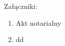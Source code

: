 \documentclass[a4paper,12pt,oneside]{article}
\begin{document}
	\tableofcontents
	
	
	
	
	
	
	
	Załączniki:
	\begin{enumerate}[label=Załącznik \arabic*]
		\item Akt notarialny
		\item dd
	\end{enumerate}
	
	
\end{document}
